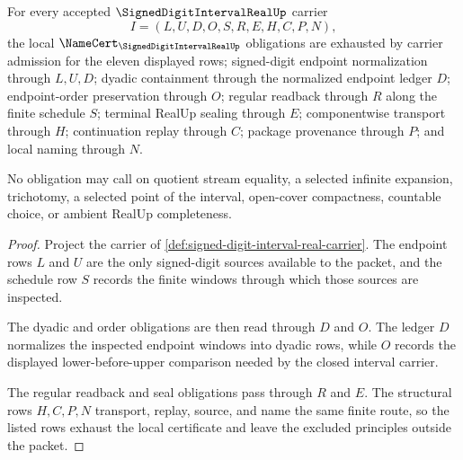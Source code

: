 \begin{theorem}
\label{thm:signed-digit-interval-real-namecert-obligations}
For every accepted $\SignedDigitIntervalRealUp$ carrier
$$
I=(L,U,D,O,S,R,E,H,C,P,N),
$$
the local $\NameCert_{\SignedDigitIntervalRealUp}$ obligations are exhausted by carrier admission for the eleven displayed rows; signed-digit endpoint normalization through $L,U,D$; dyadic containment through the normalized endpoint ledger $D$; endpoint-order preservation through $O$; regular readback through $R$ along the finite schedule $S$; terminal RealUp sealing through $E$; componentwise transport through $H$; continuation replay through $C$; package provenance through $P$; and local naming through $N$.

No obligation may call on quotient stream equality, a selected infinite expansion, trichotomy, a selected point of the interval, open-cover compactness, countable choice, or ambient RealUp completeness.
\end{theorem}
\begin{proof}
Project the carrier of \autoref{def:signed-digit-interval-real-carrier}. The endpoint rows $L$ and $U$ are the only signed-digit sources available to the packet, and the schedule row $S$ records the finite windows through which those sources are inspected.

The dyadic and order obligations are then read through $D$ and $O$. The ledger $D$ normalizes the inspected endpoint windows into dyadic rows, while $O$ records the displayed lower-before-upper comparison needed by the closed interval carrier.

The regular readback and seal obligations pass through $R$ and $E$. The structural rows $H,C,P,N$ transport, replay, source, and name the same finite route, so the listed rows exhaust the local certificate and leave the excluded principles outside the packet.
\end{proof}


